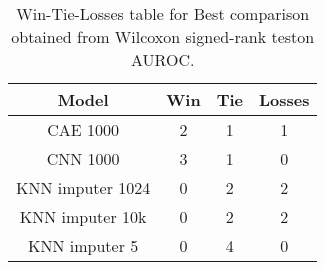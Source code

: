 \begin{table}[H]
\centering
\begin{tabular}{|c|c|c|c|}

   \textbf{Model} &  \textbf{Win} &  \textbf{Tie} &  \textbf{Losses} \\
\hline

         CAE 1000 &             2 &             1 &                1 \\
\hline
         CNN 1000 &             3 &             1 &                0 \\
\hline
 KNN imputer 1024 &             0 &             2 &                2 \\
\hline
  KNN imputer 10k &             0 &             2 &                2 \\
\hline
    KNN imputer 5 &             0 &             4 &                0 \\
\hline

\end{tabular}
\caption{Win-Tie-Losses table for Best comparison obtained from Wilcoxon signed-rank teston AUROC.}
\label{tab:best_comparison_knn_vs_cae_vs_cnn}
\end{table}